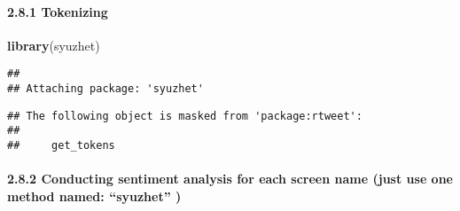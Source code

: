 \documentclass[]{article}
\newenvironment{Shaded}{\begin{snugshade}}{\end{snugshade}}
\newcommand{\CharTok}[1]{\textcolor[rgb]{0.31,0.60,0.02}{#1}}
\newcommand{\DataTypeTok}[1]{\textcolor[rgb]{0.13,0.29,0.53}{#1}}
\newcommand{\KeywordTok}[1]{\textcolor[rgb]{0.13,0.29,0.53}{\textbf{#1}}}
\newcommand{\NormalTok}[1]{#1}
\newcommand{\OperatorTok}[1]{\textcolor[rgb]{0.81,0.36,0.00}{\textbf{#1}}}
\newcommand{\StringTok}[1]{\textcolor[rgb]{0.31,0.60,0.02}{#1}}
\let\oldparagraph\paragraph
\renewcommand{\paragraph}[1]{\oldparagraph{#1}\mbox{}}
\begin{document}
\hypertarget{tokenizing}{%
\paragraph{2.8.1 Tokenizing}\label{tokenizing}}

\begin{Shaded}
\begin{Highlighting}[]
\KeywordTok{library}\NormalTok{(syuzhet)}
\end{Highlighting}
\end{Shaded}

\begin{verbatim}
## 
## Attaching package: 'syuzhet'
\end{verbatim}

\begin{verbatim}
## The following object is masked from 'package:rtweet':
## 
##     get_tokens
\end{verbatim}

\begin{Shaded}
\end{Shaded}

\hypertarget{conducting-sentiment-analysis-for-each-screen-name-just-use-one-method-named-syuzhet}{%
\paragraph{2.8.2 Conducting sentiment analysis for each screen name
(just use one method named: ``syuzhet''
)}\label{conducting-sentiment-analysis-for-each-screen-name-just-use-one-method-named-syuzhet}}
\end{document}
